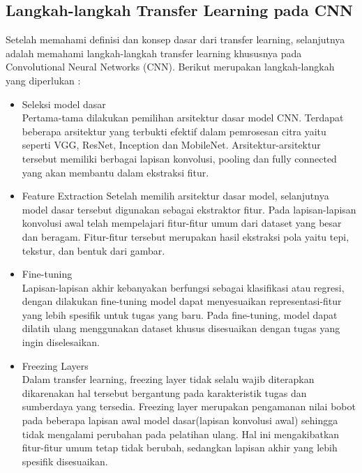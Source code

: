 \documentclass[
  letterpaper,
  DIV=11,
  numbers=noendperiod]{scrreprt}
\begin{document}
\hypertarget{langkah-langkah-transfer-learning-pada-cnn}{%
\subsection*{Langkah-langkah Transfer Learning pada
CNN}\label{langkah-langkah-transfer-learning-pada-cnn}}

Setelah memahami definisi dan konsep dasar dari transfer learning,
selanjutnya adalah memahami langkah-langkah transfer learning khususnya
pada Convolutional Neural Networks (CNN). Berikut merupakan
langkah-langkah yang diperlukan :

\begin{itemize}
\item
  Seleksi model dasar\\
  Pertama-tama dilakukan pemilihan arsitektur dasar model CNN. Terdapat
  beberapa arsitektur yang terbukti efektif dalam pemrosesan citra yaitu
  seperti VGG, ResNet, Inception dan MobileNet. Arsitektur-arsitektur
  tersebut memiliki berbagai lapisan konvolusi, pooling dan fully
  connected yang akan membantu dalam ekstraksi fitur.
\item
  Feature Extraction Setelah memilih arsitektur dasar model, selanjutnya
  model dasar tersebut digunakan sebagai ekstraktor fitur. Pada
  lapisan-lapisan konvolusi awal telah mempelajari fitur-fitur umum dari
  dataset yang besar dan beragam. Fitur-fitur tersebut merupakan hasil
  ekstraksi pola yaitu tepi, tekstur, dan bentuk dari gambar.
\item
  Fine-tuning\\
  Lapisan-lapisan akhir kebanyakan berfungsi sebagai klasifikasi atau
  regresi, dengan dilakukan fine-tuning model dapat menyesuaikan
  representasi-fitur yang lebih spesifik untuk tugas yang baru. Pada
  fine-tuning, model dapat dilatih ulang menggunakan dataset khusus
  disesuaikan dengan tugas yang ingin diselesaikan.
\item
  Freezing Layers\\
  Dalam transfer learning, freezing layer tidak selalu wajib diterapkan
  dikarenakan hal tersebut bergantung pada karakteristik tugas dan
  sumberdaya yang tersedia. Freezing layer merupakan pengamanan nilai
  bobot pada beberapa lapisan awal model dasar(lapisan konvolusi awal)
  sehingga tidak mengalami perubahan pada pelatihan ulang. Hal ini
  mengakibatkan fitur-fitur umum tetap tidak berubah, sedangkan lapisan
  akhir yang lebih spesifik disesuaikan.

\end{itemize}
\end{document}
